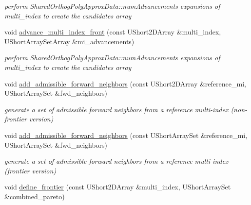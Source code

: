 \begin{DoxyCompactItemize}
\begin{DoxyCompactList}\small\item\em perform Shared\+Orthog\+Poly\+Approx\+Data\+::num\+Advancements expansions of multi\+\_\+index to create the candidates array \end{DoxyCompactList}\item 
void \hyperlink{classPecos_1_1RegressOrthogPolyApproximation_a6d892728f3028e8c4e2e3f58d6b1b6f1}{advance\+\_\+multi\+\_\+index\+\_\+front} (const U\+Short2\+D\+Array \&multi\+\_\+index, U\+Short\+Array\+Set\+Array \&mi\+\_\+advancements)\label{classPecos_1_1RegressOrthogPolyApproximation_a6d892728f3028e8c4e2e3f58d6b1b6f1}

\begin{DoxyCompactList}\small\item\em perform Shared\+Orthog\+Poly\+Approx\+Data\+::num\+Advancements expansions of multi\+\_\+index to create the candidates array \end{DoxyCompactList}\item 
void \hyperlink{classPecos_1_1RegressOrthogPolyApproximation_a9fecb74763f160cfbcfd7c959e79413b}{add\+\_\+admissible\+\_\+forward\+\_\+neighbors} (const U\+Short2\+D\+Array \&reference\+\_\+mi, U\+Short\+Array\+Set \&fwd\+\_\+neighbors)\label{classPecos_1_1RegressOrthogPolyApproximation_a9fecb74763f160cfbcfd7c959e79413b}

\begin{DoxyCompactList}\small\item\em generate a set of admissible forward neighbors from a reference multi-\/index (non-\/frontier version) \end{DoxyCompactList}\item 
void \hyperlink{classPecos_1_1RegressOrthogPolyApproximation_a923e8924a329aebd0b942481762c5191}{add\+\_\+admissible\+\_\+forward\+\_\+neighbors} (const U\+Short\+Array\+Set \&reference\+\_\+mi, U\+Short\+Array\+Set \&fwd\+\_\+neighbors)\label{classPecos_1_1RegressOrthogPolyApproximation_a923e8924a329aebd0b942481762c5191}

\begin{DoxyCompactList}\small\item\em generate a set of admissible forward neighbors from a reference multi-\/index (frontier version) \end{DoxyCompactList}\item 
void \hyperlink{classPecos_1_1RegressOrthogPolyApproximation_acc325af7bfbd577cde6db5a0a4ee3a65}{define\+\_\+frontier} (const U\+Short2\+D\+Array \&multi\+\_\+index, U\+Short\+Array\+Set \&combined\+\_\+pareto)\label{classPecos_1_1RegressOrthogPolyApproximation_acc325af7bfbd577cde6db5a0a4ee3a65}


\end{DoxyCompactItemize}
